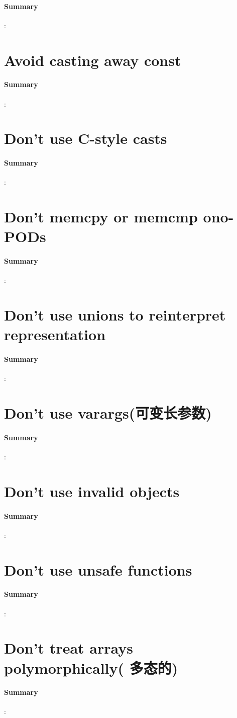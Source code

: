 \documentclass[UTF8,a4paper,12pt]{ctexbook}
\begin{document}
		\paragraph{Summary}:
		
		
	\section{Avoid casting away const}
		\paragraph{Summary}:
		
		
	\section{Don't use C-style casts}
		\paragraph{Summary}:
		
		
	\section{Don't memcpy or  memcmp ono-PODs}
		\paragraph{Summary}:
		
		
	\section{Don't use unions to reinterpret representation}
		\paragraph{Summary}:
		
		
	\section{Don't use varargs(可变长参数)}
		\paragraph{Summary}:
		
		
	\section{Don't use invalid objects}
		\paragraph{Summary}:
		
		
	\section{Don't use unsafe functions}
		\paragraph{Summary}:
		
		
	\section{Don't treat arrays polymorphically( 多态的)}
		\paragraph{Summary}:
			
\end{document}
